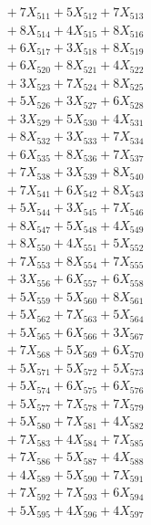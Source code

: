 \documentclass[a4paper,10pt]{article}
\begin{document}
{\begin{align}
&\;  + 7 X_{511} + 5 X_{512} + 7 X_{513} \\[0.3ex]
&\;  + 8 X_{514} + 4 X_{515} + 8 X_{516} \\[0.3ex]
&\;  + 6 X_{517} + 3 X_{518} + 8 X_{519} \\[0.5ex]\allowbreak
&\;  + 6 X_{520} + 8 X_{521} + 4 X_{522} \\[0.3ex]
&\;  + 3 X_{523} + 7 X_{524} + 8 X_{525} \\[0.3ex]
&\;  + 5 X_{526} + 3 X_{527} + 6 X_{528} \\[0.3ex]
&\;  + 3 X_{529} + 5 X_{530} + 4 X_{531} \\[0.3ex]
&\;  + 8 X_{532} + 3 X_{533} + 7 X_{534} \\[0.3ex]
&\;  + 6 X_{535} + 8 X_{536} + 7 X_{537} \\[0.3ex]
&\;  + 7 X_{538} + 3 X_{539} + 8 X_{540} \\[0.3ex]
&\;  + 7 X_{541} + 6 X_{542} + 8 X_{543} \\[0.3ex]
&\;  + 5 X_{544} + 3 X_{545} + 7 X_{546} \\[0.3ex]
&\;  + 8 X_{547} + 5 X_{548} + 4 X_{549} \\[0.5ex]\allowbreak
&\;  + 8 X_{550} + 4 X_{551} + 5 X_{552} \\[0.3ex]
&\;  + 7 X_{553} + 8 X_{554} + 7 X_{555} \\[0.3ex]
&\;  + 3 X_{556} + 6 X_{557} + 6 X_{558} \\[0.3ex]
&\;  + 5 X_{559} + 5 X_{560} + 8 X_{561} \\[0.3ex]
&\;  + 5 X_{562} + 7 X_{563} + 5 X_{564} \\[0.3ex]
&\;  + 5 X_{565} + 6 X_{566} + 3 X_{567} \\[0.3ex]
&\;  + 7 X_{568} + 5 X_{569} + 6 X_{570} \\[0.3ex]
&\;  + 5 X_{571} + 5 X_{572} + 5 X_{573} \\[0.3ex]
&\;  + 5 X_{574} + 6 X_{575} + 6 X_{576} \\[0.3ex]
&\;  + 5 X_{577} + 7 X_{578} + 7 X_{579} \\[0.5ex]\allowbreak
&\;  + 5 X_{580} + 7 X_{581} + 4 X_{582} \\[0.3ex]
&\;  + 7 X_{583} + 4 X_{584} + 7 X_{585} \\[0.3ex]
&\;  + 7 X_{586} + 5 X_{587} + 4 X_{588} \\[0.3ex]
&\;  + 4 X_{589} + 5 X_{590} + 7 X_{591} \\[0.3ex]
&\;  + 7 X_{592} + 7 X_{593} + 6 X_{594} \\[0.3ex]
&\;  + 5 X_{595} + 4 X_{596} + 4 X_{597} \\[0.3ex]

\end{align}}
\end{document}
